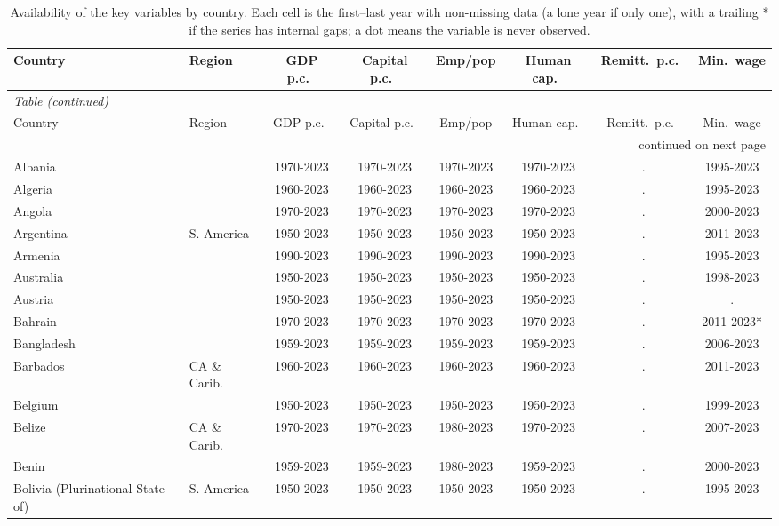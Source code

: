 \begin{longtable}{ll*{6}{c}}
\caption{Availability of the key variables by country. Each cell is the first--last year with non-missing data (a lone year if only one), with a trailing * if the series has internal gaps; a dot means the variable is never observed.\label{tab:coverage}}\\
\toprule Country & Region & GDP p.c.\ & Capital p.c.\ & Emp/pop & Human cap.\ & Remitt.\ p.c.\ & Min.\ wage \\ \midrule
\endfirsthead
\multicolumn{8}{l}{\itshape\small Table \thetable{} (continued)}\\
\toprule Country & Region & GDP p.c.\ & Capital p.c.\ & Emp/pop & Human cap.\ & Remitt.\ p.c.\ & Min.\ wage \\ \midrule
\endhead
\midrule \multicolumn{8}{r}{\small continued on next page}\\
\endfoot
\bottomrule
\endlastfoot
Albania &  & 1970-2023 & 1970-2023 & 1970-2023 & 1970-2023 & . & 1995-2023 \\
Algeria &  & 1960-2023 & 1960-2023 & 1960-2023 & 1960-2023 & . & 1995-2023 \\
Angola &  & 1970-2023 & 1970-2023 & 1970-2023 & 1970-2023 & . & 2000-2023 \\
Argentina & S. America & 1950-2023 & 1950-2023 & 1950-2023 & 1950-2023 & . & 2011-2023 \\
Armenia &  & 1990-2023 & 1990-2023 & 1990-2023 & 1990-2023 & . & 1995-2023 \\
Australia &  & 1950-2023 & 1950-2023 & 1950-2023 & 1950-2023 & . & 1998-2023 \\
Austria &  & 1950-2023 & 1950-2023 & 1950-2023 & 1950-2023 & . & . \\
Bahrain &  & 1970-2023 & 1970-2023 & 1970-2023 & 1970-2023 & . & 2011-2023* \\
Bangladesh &  & 1959-2023 & 1959-2023 & 1959-2023 & 1959-2023 & . & 2006-2023 \\
Barbados & CA \& Carib. & 1960-2023 & 1960-2023 & 1960-2023 & 1960-2023 & . & 2011-2023 \\
Belgium &  & 1950-2023 & 1950-2023 & 1950-2023 & 1950-2023 & . & 1999-2023 \\
Belize & CA \& Carib. & 1970-2023 & 1970-2023 & 1980-2023 & 1970-2023 & . & 2007-2023 \\
Benin &  & 1959-2023 & 1959-2023 & 1980-2023 & 1959-2023 & . & 2000-2023 \\
Bolivia (Plurinational State of) & S. America & 1950-2023 & 1950-2023 & 1950-2023 & 1950-2023 & . & 1995-2023 \\

\end{longtable}
